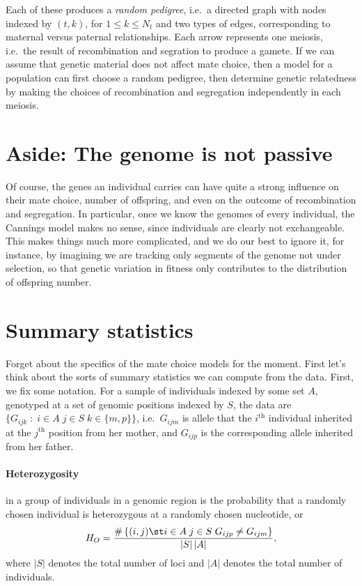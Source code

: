 Each of these produces a \emph{random pedigree}, 
i.e.\ a directed graph with nodes indexed by $(t,k)$, for $1 \le k \le N_t$
and two types of edges, corresponding to maternal versus paternal relationships.
Each arrow represents one meiosis, i.e.\ the result of recombination and segration to produce a gamete.
If we can assume that genetic material does not affect mate choice,
then a model for a population can first choose a random pedigree,
then determine genetic relatedness by making the choices of recombination and segregation
independently in each meiosis.



\section*{Aside: The genome is not passive}

Of course, the genes an individual carries can have quite a strong influence
on their mate choice, number of offspring, and even on the outcome of recombination and segregation.
In particular, once we know the genomes of every individual, the Cannings model makes no sense,
since individuals are clearly not exchangeable.
This makes things much more complicated,
and we do our best to ignore it,
for instance, by imagining we are tracking only segments of the genome not under selection,
so that genetic variation in fitness only contributes to the distribution of offspring number.


\section{Summary statistics}

Forget about the specifics of the mate choice models for the moment.
First let's think about the sorts of summary statistics we can compute from the data.
First, we fix some notation.
For a sample of individuals indexed by some set $A$,
genotyped at a set of genomic positions indexed by $S$,
the data are $\{G_{ijk} \; : \; i \in A \; j \in S \; k \in \{m,p\} \}$,
i.e.\ $G_{ijm}$ is allele that the $i^\mathrm{th}$ individual inherited at the $j^\mathrm{th}$ position from her mother,
and $G_{ijp}$ is the corresponding allele inherited from her father.


\paragraph{Heterozygosity} in a group of individuals in a genomic region 
is the probability that a randomly chosen individual is heterozygous at a randomly chosen nucleotide,
or 
\begin{align}
  H_O = \frac{ \# \left\{ (i,j) \st i \in A \; j \in S \; G_{ijp} \neq G_{ijm} \right\} }{ |S|\,|A| } ,
\end{align}
where $|S|$ denotes the total number of loci and $|A|$ denotes the total number of individuals.

